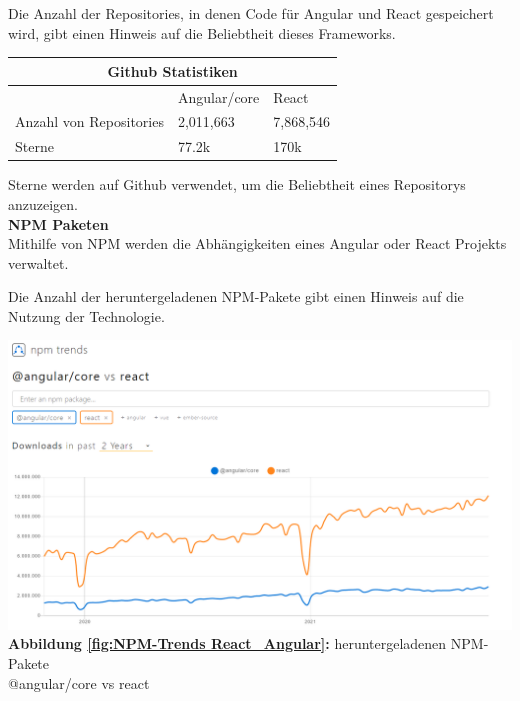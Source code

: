 Die Anzahl der Repositories, in denen Code für Angular und React gespeichert wird, gibt einen Hinweis auf die Beliebtheit dieses Frameworks.
\\
\begin{table}[h!]
  \centering
  \begin{tabular}{ |p{5cm}||p{3.6cm}|p{3.6cm}|  }
    \hline
    \multicolumn{3}{|c|}{Github Statistiken}\\
    \hline 
    & Angular/core & React\\
    \hline
    Anzahl von Repositories & 2,011,663& 7,868,546
    \\
    \hline
    Sterne & 77.2k & 170k
    \\
    \hline
  \end{tabular}
\end{table}
{\cite{GH04, GH06}}
\begin{flushleft}
  Sterne werden auf Github verwendet, um die Beliebtheit eines Repositorys anzuzeigen.
\\
  \textbf{NPM Paketen}\\
  Mithilfe von NPM werden die Abhängigkeiten eines Angular oder React Projekts verwaltet.

  Die Anzahl der heruntergeladenen NPM-Pakete gibt einen Hinweis auf die Nutzung der Technologie.
\end{flushleft}

\begin{center}
  \includegraphics[scale=0.4]
  {sources/NPM-Trends React_Angular}\label{fig:NPM-Trends React_Angular}\\
  \textbf{Abbildung \autoref{fig:NPM-Trends React_Angular}:} heruntergeladenen NPM-Pakete \\@angular/core vs react
    {\cite{NPM01}}
\end{center}

